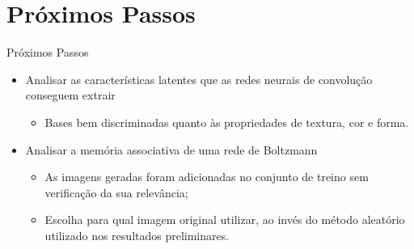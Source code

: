 \documentclass{beamer}
\begin{document}
\section{Próximos Passos}
\begin{frame}{Próximos Passos}
  \begin{itemize}
  \item Analisar as características latentes que as redes neurais de convolução conseguem extrair
    \begin{itemize}
      \item Bases bem discriminadas quanto às propriedades de textura, cor e forma.
    \end{itemize}
  \item Analisar a memória associativa de uma rede de Boltzmann 
  \begin{itemize}
    \item As imagens geradas foram adicionadas no conjunto de treino sem verificação da sua relevância;
    \item Escolha para qual imagem original utilizar, ao invés do método aleatório utilizado nos resultados preliminares.
  \end{itemize}
  \end{itemize}



\end{frame}
\end{document}
